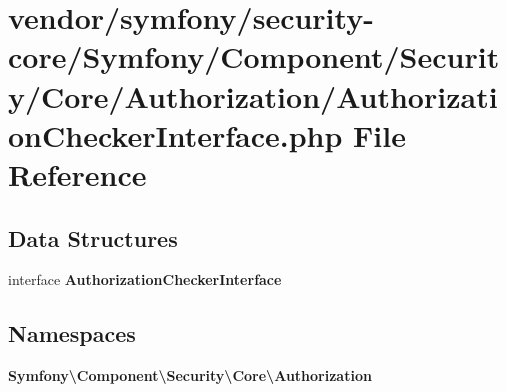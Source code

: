\section{vendor/symfony/security-\/core/\+Symfony/\+Component/\+Security/\+Core/\+Authorization/\+Authorization\+Checker\+Interface.php File Reference}
\label{_authorization_checker_interface_8php}
\subsection*{Data Structures}
\begin{DoxyCompactItemize}
\item 
interface {\bf Authorization\+Checker\+Interface}
\end{DoxyCompactItemize}
\subsection*{Namespaces}
\begin{DoxyCompactItemize}
\item 
 {\bf Symfony\textbackslash{}\+Component\textbackslash{}\+Security\textbackslash{}\+Core\textbackslash{}\+Authorization}
\end{DoxyCompactItemize}
